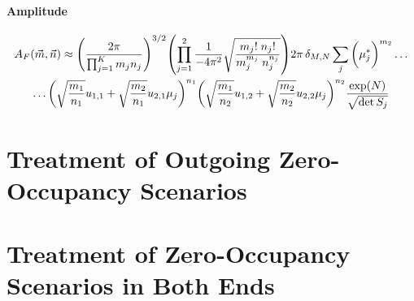 \documentclass[
	english,
	a4paper,
	fontsize=10pt,
	parskip=half,
	titlepage=true,
	DIV=12,
	final
]{scrreprt}
\begin{document}
\subsubsection{Amplitude}
\begin{multline}
	A_F(\vec{m}, \vec{n})
\approx
	\qty(\frac
		{2\pi}
		{\prod_{j=1}^{K} m_j n_j}
	)^{3/2}
	\qty(
		\prod_{j=1}^{2}
		\frac
			{1}
			{-4\pi^{2}}
		\sqrt{\frac
			{m_j!      \; n_j!}
			{m_j^{m_j} \; n_j^{n_j} }
		}
	)
	2\pi \, \delta_{M,N}
	\sum_{j}
		\qty(\bigg. \mu_j^*)^{m_2}
	\ldots
\\
	\ldots
		\qty(\sqrt{\frac{m_1}{n_1}} u_{1,1}  +  \sqrt{\frac{m_2}{n_1}} u_{2,1} \mu_{j})^{n_1}
		\qty(\sqrt{\frac{m_1}{n_2}} u_{1,2}  +  \sqrt{\frac{m_2}{n_2}} u_{2,2} \mu_{j})^{n_2}
	\frac
		{\exp(N)}
		{\sqrt{\det S_j}}
\end{multline}

\chapter{Treatment of Outgoing Zero-Occupancy Scenarios}

\chapter{Treatment of Zero-Occupancy Scenarios in Both Ends}
\end{document}

